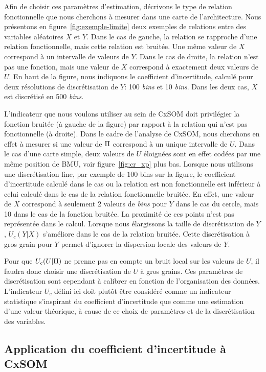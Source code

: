 \documentclass[../main]{subfiles}
\begin{document}
Afin de choisir ces paramètres d'estimation, décrivons le type de relation fonctionnelle que nous cherchons à mesurer dans une carte de l'architecture.
Nous présentons en figure~\ref{fig:exemple-limite} deux exemples de relations entre des variables aléatoires $X$ et $Y$. Dans le cas de gauche, la relation se rapproche d'une relation fonctionnelle, mais cette relation est bruitée. Une même valeur de $X$ correspond à un intervalle de valeurs de $Y$. Dans le cas de droite, la relation n'est pas une fonction, mais une valeur de $X$ correspond à exactement deux valeurs de $U$. En haut de la figure, nous indiquons le coefficient d'incertitude, calculé pour deux résolutions de discrétisation de $Y$: 100 \emph{bins} et 10 \emph{bins}. Dans les deux cas, $X$ est discrétisé en 500 \emph{bins}.


L'indicateur que nous voulons utiliser au sein de CxSOM doit privilégier la fonction bruitée (à gauche de la figure) par rapport à la relation qui n'est pas fonctionnelle (à droite).
Dans le cadre de l'analyse de CxSOM, nous cherchons en effet à mesurer si une valeur de $\Pi$ correspond à un unique intervalle de $U$. 
Dans le cas d'une carte simple, deux valeurs de $U$ éloignées sont en effet codées par une même position de BMU, voir figure~\ref{fig:cr_xp} plus bas.
Lorsque nous utilisons une discrétisation fine, par exemple de $100$ bins sur la figure, le coefficient d'incertitude calculé dans le cas ou la relation est non fonctionnelle est inférieur à celui calculé dans le cas de la relation fonctionnelle bruitée.
En effet, une valeur de $X$ correspond à seulement 2 valeurs de \emph{bins} pour $Y$ dans le cas du cercle, mais 10 dans le cas de la fonction bruitée. La proximité de ces points n'est pas représentée dans le calcul.
Lorsque nous élargissons la taille de discrétisation de $Y$, $U_c(Y|X)$ s'améliore dans le cas de la relation bruitée. Cette discrétisation à gros grain pour $Y$ permet d'ignorer la dispersion locale des valeurs de $Y$.

Pour que $U_c(U|\Pi)$ ne prenne pas en compte un bruit local sur les valeurs de $U$, il faudra donc choisir une discrétisation de $U$ à gros grains. Ces paramètres de discrétisation sont cependant à calibrer en fonction de l'organisation des données.
L'indicateur $U_c$ défini ici doit plutôt être considéré comme un indicateur statistique s'inspirant du coefficient d'incertitude que comme une estimation d'une valeur théorique, à cause de ce choix de paramètres et de la discrétisation des variables.

\subsection{Application du coefficient d'incertitude à CxSOM}
\end{document}
